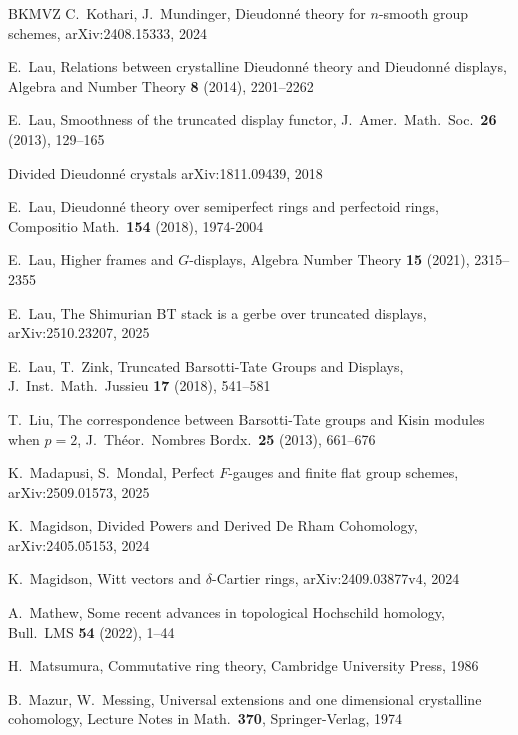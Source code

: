 \documentclass[a4paper,11pt]{amsart}
\theoremstyle{plain}
\theoremstyle{definition}
\theoremstyle{remark}
\numberwithin{equation}{section}
\begin{document}
\begin{thebibliography}{BKMVZ}
C.~Kothari, J.~Mundinger,
Dieudonn\'e theory for $n$-smooth group schemes,
arXiv:2408.15333, 2024

%
E.~Lau,
Relations between crystalline Dieudonn\'e theory and Dieudonn\'e displays,
Algebra and Number Theory {\bf 8} (2014), 2201--2262

E.~Lau, 
Smoothness of the truncated display functor,
J.\ Amer.\ Math.\ Soc.\ {\bf  26} (2013), 129--165 

Divided Dieudonn\'e crystals
arXiv:1811.09439, 2018

E.~Lau,
Dieudonn\'e theory over semiperfect rings and perfectoid rings,
Compositio Math.\ {\bf 154} (2018), 1974-2004

E.~Lau, 
Higher frames and $G$-displays, Algebra Number Theory {\bf 15} (2021), 2315--2355

E.~Lau,
The Shimurian BT stack is a gerbe over truncated displays, 
arXiv:2510.23207, 2025

E.~Lau, T.~Zink, Truncated Barsotti-Tate Groups and Displays, J.\ Inst.\ Math.\ Jussieu {\bf 17} (2018), 541--581

T.~Liu,
The correspondence between Barsotti-Tate groups and Kisin modules when $p=2$,
J.~Th\'eor.\ Nombres Bordx.\ {\bf 25} (2013), 661--676

K.~Madapusi, S.~Mondal,
Perfect $F$-gauges and finite flat group schemes,
arXiv:2509.01573, 2025

K.~Magidson,
Divided Powers and Derived De Rham Cohomology,
arXiv:2405.05153, 2024

K.~Magidson,
Witt vectors and $\delta$-Cartier rings,
arXiv:2409.03877v4, 2024

A.~Mathew,
Some recent advances in topological Hochschild homology,
Bull.\ LMS {\bf 54} (2022), 1--44

H.~Matsumura,
Commutative ring theory,
Cambridge University Press, 1986

B.~Mazur, W.~Messing, 
Universal extensions and one dimensional crystalline cohomology,
Lecture Notes in Math.\ {\bf 370}, Springer-Verlag, 1974


\end{thebibliography}
\end{document}
